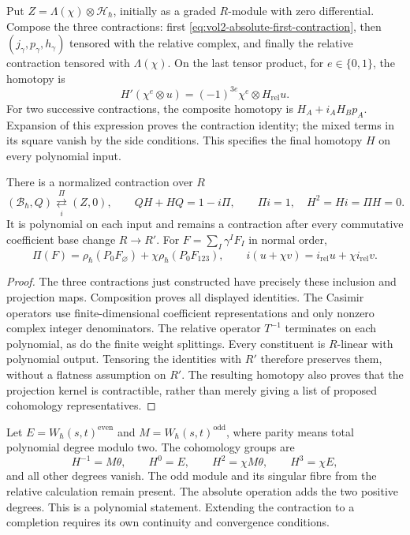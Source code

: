 Put $Z=\Lambda(\chi)\otimes\mathcal H_\hbar$, initially
as a graded $R$-module with zero differential.
Compose the three contractions: first
\eqref{eq:vol2-absolute-first-contraction}, then
$(j_\gamma,p_\gamma,h_\gamma)$ tensored with the relative
complex, and finally the relative contraction tensored with
$\Lambda(\chi)$.
On the last tensor product, for $e\in\{0,1\}$, the homotopy is
\[
 H'(\chi^e\otimes u)
       =(-1)^{3e}\chi^e
                                      \otimes H_{\mathrm{rel}}u.
\]
For two successive contractions, the composite homotopy is
$H_A+i_AH_Bp_A$.
Expansion of this expression proves the contraction identity;
the mixed terms in its square vanish by the side conditions.
This specifies the final homotopy $H$ on every polynomial input.

\begin{theorem}\label{thm:vol2-absolute-contraction}
There is a normalized contraction over $R$
\[
 (\mathcal B_\hbar,Q)
    \underset{i}{\overset{\Pi}{\rightleftarrows}}(Z,0),
 \qquad QH+HQ=1-i\Pi,
 \qquad \Pi i=1,\quad H^2=Hi=\Pi H=0.
\]
It is polynomial on each input and remains a contraction
after every commutative coefficient base change $R\to R'$.
For $F=\sum_I\gamma^IF_I$ in normal order,
\begin{equation}\label{eq:vol2-absolute-projection}
 \Pi(F)=\rho_\hbar(P_0F_\varnothing)
            +\chi\rho_\hbar(P_0F_{123}),
 \qquad
 i(u+\chi v)=i_{\mathrm{rel}}u+\chi i_{\mathrm{rel}}v.
\end{equation}
\end{theorem}

\begin{proof}
The three contractions just constructed have precisely these
inclusion and projection maps. Composition proves all displayed
identities. The Casimir operators use finite-dimensional
coefficient representations and only nonzero complex integer
denominators. The relative operator $T^{-1}$ terminates on
each polynomial, as do the finite weight splittings.
Every constituent is $R$-linear with polynomial output.
Tensoring the identities with $R'$ therefore preserves them,
without a flatness assumption on $R'$.
The resulting homotopy also proves that the projection kernel
is contractible, rather than merely giving a list of proposed
cohomology representatives.
\end{proof}

Let $E=W_\hbar(s,t)^{\mathrm{even}}$ and
$M=W_\hbar(s,t)^{\mathrm{odd}}$, where parity means total
polynomial degree modulo two. The cohomology groups are
\begin{equation}\label{eq:vol2-absolute-cohomology-degrees}
 H^{-1}=M\theta,
 \qquad H^0=E,
 \qquad H^2=\chi M\theta,
 \qquad H^3=\chi E,
\end{equation}
and all other degrees vanish. The odd module and its singular
fibre from the relative calculation remain present.
The absolute operation adds the two positive degrees.
This is a polynomial statement. Extending the contraction to
a completion requires its own continuity and convergence
conditions.

